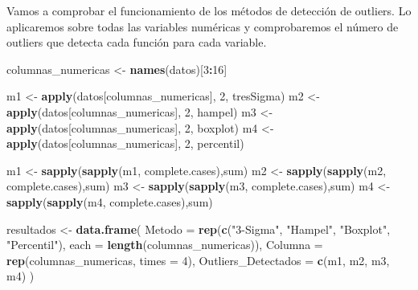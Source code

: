 \documentclass[notspecified,article,submit,moreauthors,pdftex]{Definitions/mdpi}
\newenvironment{Shaded}{\begin{snugshade}}{\end{snugshade}}
\newcommand{\AttributeTok}[1]{\textcolor[rgb]{0.13,0.29,0.53}{#1}}
\newcommand{\DecValTok}[1]{\textcolor[rgb]{0.00,0.00,0.81}{#1}}
\newcommand{\FunctionTok}[1]{\textcolor[rgb]{0.13,0.29,0.53}{\textbf{#1}}}
\newcommand{\NormalTok}[1]{#1}
\newcommand{\OtherTok}[1]{\textcolor[rgb]{0.56,0.35,0.01}{#1}}
\newcommand{\SpecialCharTok}[1]{\textcolor[rgb]{0.81,0.36,0.00}{\textbf{#1}}}
\newcommand{\StringTok}[1]{\textcolor[rgb]{0.31,0.60,0.02}{#1}}
\begin{document}
Vamos a comprobar el funcionamiento de los métodos de detección de
outliers. Lo aplicaremos sobre todas las variables numéricas y
comprobaremos el número de outliers que detecta cada función para cada
variable.

\begin{Shaded}
\begin{Highlighting}[]
\NormalTok{columnas\_numericas }\OtherTok{\textless{}{-}} \FunctionTok{names}\NormalTok{(datos)[}\DecValTok{3}\SpecialCharTok{:}\DecValTok{16}\NormalTok{]}

\NormalTok{m1 }\OtherTok{\textless{}{-}} \FunctionTok{apply}\NormalTok{(datos[columnas\_numericas], }\DecValTok{2}\NormalTok{, tresSigma)}
\NormalTok{m2 }\OtherTok{\textless{}{-}} \FunctionTok{apply}\NormalTok{(datos[columnas\_numericas], }\DecValTok{2}\NormalTok{, hampel)}
\NormalTok{m3 }\OtherTok{\textless{}{-}} \FunctionTok{apply}\NormalTok{(datos[columnas\_numericas], }\DecValTok{2}\NormalTok{, boxplot)}
\NormalTok{m4 }\OtherTok{\textless{}{-}} \FunctionTok{apply}\NormalTok{(datos[columnas\_numericas], }\DecValTok{2}\NormalTok{, percentil)}

\NormalTok{m1 }\OtherTok{\textless{}{-}} \FunctionTok{sapply}\NormalTok{(}\FunctionTok{sapply}\NormalTok{(m1, complete.cases),sum)}
\NormalTok{m2 }\OtherTok{\textless{}{-}} \FunctionTok{sapply}\NormalTok{(}\FunctionTok{sapply}\NormalTok{(m2, complete.cases),sum)}
\NormalTok{m3 }\OtherTok{\textless{}{-}} \FunctionTok{sapply}\NormalTok{(}\FunctionTok{sapply}\NormalTok{(m3, complete.cases),sum)}
\NormalTok{m4 }\OtherTok{\textless{}{-}} \FunctionTok{sapply}\NormalTok{(}\FunctionTok{sapply}\NormalTok{(m4, complete.cases),sum)}

\NormalTok{resultados }\OtherTok{\textless{}{-}} \FunctionTok{data.frame}\NormalTok{(}
  \AttributeTok{Metodo =} \FunctionTok{rep}\NormalTok{(}\FunctionTok{c}\NormalTok{(}\StringTok{"3{-}Sigma"}\NormalTok{, }\StringTok{"Hampel"}\NormalTok{, }\StringTok{"Boxplot"}\NormalTok{, }\StringTok{"Percentil"}\NormalTok{), }\AttributeTok{each =} \FunctionTok{length}\NormalTok{(columnas\_numericas)),}
  \AttributeTok{Columna =} \FunctionTok{rep}\NormalTok{(columnas\_numericas, }\AttributeTok{times =} \DecValTok{4}\NormalTok{),}
  \AttributeTok{Outliers\_Detectados =} \FunctionTok{c}\NormalTok{(m1, m2, m3, m4)}
\NormalTok{)}


\end{Highlighting}
\end{Shaded}
\end{document}

